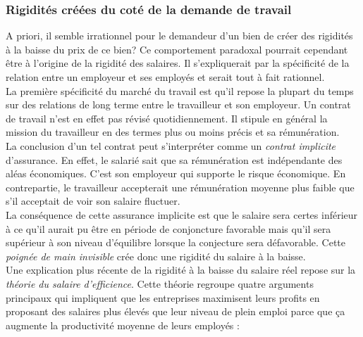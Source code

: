 \documentclass[10pt]{book}
\begin{document}
\subsubsection{Rigidités créées du coté de la demande de travail}
A priori, il semble irrationnel pour le demandeur d'un bien de créer des rigidités à la baisse du prix de ce bien? Ce comportement paradoxal pourrait cependant être à l'origine de la rigidité des salaires. Il s'expliquerait par la spécificité de la relation entre un employeur et ses employés et serait tout à fait rationnel. \\
La première spécificité du marché du travail est qu'il repose la plupart du temps sur des relations de long terme entre le travailleur et son employeur. Un contrat de travail n'est en effet pas révisé quotidiennement. Il stipule en général la mission du travailleur en des termes plus ou moins précis et sa rémunération. \\
La conclusion d'un tel contrat peut s'interpréter comme un \textit{contrat implicite} d'assurance. En effet, le salarié sait que sa rémunération est indépendante des aléas économiques. C'est son employeur qui supporte le risque économique. En contrepartie, le travailleur accepterait une rémunération moyenne plus faible que s'il acceptait de voir son salaire fluctuer. \\
La conséquence de cette assurance implicite est que le salaire sera certes inférieur à ce qu'il aurait pu être en période de conjoncture favorable mais qu'il sera supérieur à son niveau d'équilibre lorsque la conjecture sera défavorable. Cette \textit{poignée de main invisible} crée donc une rigidité du salaire à la baisse. \\
Une explication plus récente de la rigidité à la baisse du salaire réel repose sur la \textit{théorie du salaire d'efficience}. Cette théorie regroupe quatre arguments principaux qui impliquent que les entreprises maximisent leurs profits en proposant des salaires plus élevés que leur niveau de plein emploi parce que ça augmente la productivité moyenne de leurs employés : 
\end{document}
